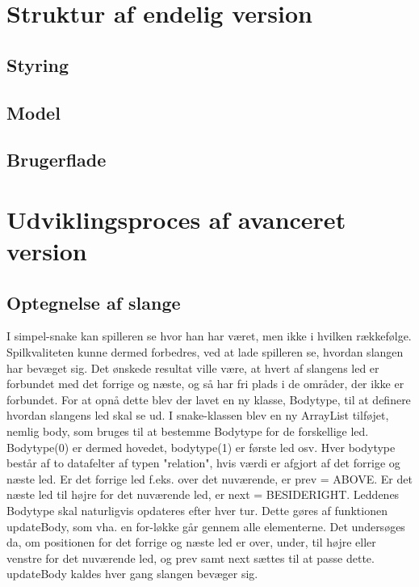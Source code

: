 \section{Struktur af endelig version}

\subsection{Styring}

\subsection{Model}

\subsection{Brugerflade}


\section{Udviklingsproces  af avanceret version}

\subsection{Optegnelse af slange}

I simpel-snake kan spilleren se hvor han har været, men ikke i hvilken rækkefølge. Spilkvaliteten kunne dermed forbedres, ved at lade spilleren se, hvordan slangen har bevæget sig. Det ønskede resultat ville være, at hvert af slangens led er forbundet med det forrige og næste, og så har fri plads i de områder, der ikke er forbundet.
For at opnå dette blev der lavet en ny klasse, Bodytype, til at definere hvordan slangens led skal se ud. I snake-klassen blev en ny ArrayList tilføjet, nemlig body, som bruges til at bestemme Bodytype for de forskellige led. Bodytype(0) er dermed hovedet, bodytype(1) er første led osv. Hver bodytype består af to datafelter af typen "relation", hvis værdi er afgjort af det forrige og næste led. Er det forrige led f.eks. over det nuværende, er prev = ABOVE. Er det næste led til højre for det nuværende led, er next = BESIDERIGHT.
Leddenes Bodytype skal naturligvis opdateres efter hver tur. Dette gøres af funktionen updateBody, som vha. en for-løkke går gennem alle elementerne. Det undersøges da, om positionen for det forrige og næste led er over, under, til højre eller venstre for det nuværende led, og prev samt next sættes til at passe dette. updateBody kaldes hver gang slangen bevæger sig.

